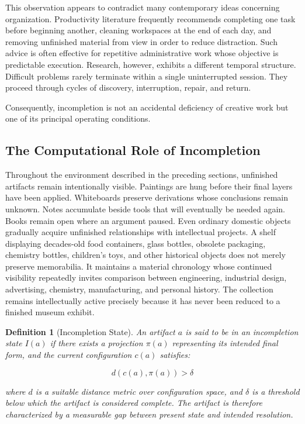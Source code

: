 \documentclass[12pt,oneside]{article}
\newtheorem{definition}{Definition}[section]
\theoremstyle{remark}
\begin{document}
This observation appears to contradict many contemporary ideas concerning organization. Productivity literature frequently recommends completing one task before beginning another, cleaning workspaces at the end of each day, and removing unfinished material from view in order to reduce distraction. Such advice is often effective for repetitive administrative work whose objective is predictable execution. Research, however, exhibits a different temporal structure. Difficult problems rarely terminate within a single uninterrupted session. They proceed through cycles of discovery, interruption, repair, and return.

Consequently, incompletion is not an accidental deficiency of creative work but one of its principal operating conditions.

\subsection{The Computational Role of Incompletion}

Throughout the environment described in the preceding sections, unfinished artifacts remain intentionally visible. Paintings are hung before their final layers have been applied. Whiteboards preserve derivations whose conclusions remain unknown. Notes accumulate beside tools that will eventually be needed again. Books remain open where an argument paused. Even ordinary domestic objects gradually acquire unfinished relationships with intellectual projects. A shelf displaying decades-old food containers, glass bottles, obsolete packaging, chemistry bottles, children's toys, and other historical objects does not merely preserve memorabilia. It maintains a material chronology whose continued visibility repeatedly invites comparison between engineering, industrial design, advertising, chemistry, manufacturing, and personal history. The collection remains intellectually active precisely because it has never been reduced to a finished museum exhibit.

\begin{definition}[Incompletion State]
An artifact $a$ is said to be in an incompletion state $I(a)$ if there exists a projection $\pi(a)$ representing its intended final form, and the current configuration $c(a)$ satisfies:

\begin{equation}
d(c(a), \pi(a)) > \delta
\end{equation}

where $d$ is a suitable distance metric over configuration space, and $\delta$ is a threshold below which the artifact is considered complete. The artifact is therefore characterized by a measurable gap between present state and intended resolution.
\end{definition}
\end{document}
